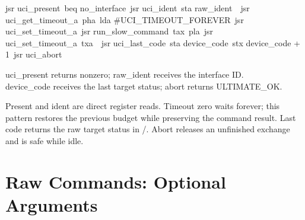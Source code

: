 \begin{listingbox}
\hspace*{2em}jsr uci\_present\
\hspace*{2em}beq no\_interface\
\hspace*{2em}jsr uci\_ident\
\hspace*{2em}sta raw\_ident\
\
\hspace*{2em}jsr uci\_get\_timeout\_a\
\hspace*{2em}pha\
\hspace*{2em}lda \#UCI\_TIMEOUT\_FOREVER\
\hspace*{2em}jsr uci\_set\_timeout\_a\
\hspace*{2em}jsr run\_slow\_command\
\hspace*{2em}tax\
\hspace*{2em}pla\
\hspace*{2em}jsr uci\_set\_timeout\_a\
\hspace*{2em}txa\
\
\hspace*{2em}jsr uci\_last\_code\
\hspace*{2em}sta device\_code\
\hspace*{2em}stx device\_code + 1\
\hspace*{2em}jsr uci\_abort
\end{listingbox}

\begin{resultbox}
uci_present returns nonzero; raw_ident receives the interface ID.\\
device_code receives the last target status; abort returns ULTIMATE_OK.
\end{resultbox}

Present and ident are direct register reads. Timeout zero waits forever; this
pattern restores the previous budget while preserving the command result.
Last code returns the raw target status in /. Abort releases an
unfinished exchange and is safe while idle.

\section{Raw Commands: Optional Arguments}

